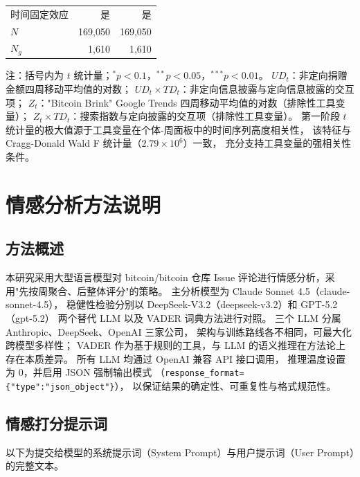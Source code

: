 \documentclass[
    type = master, %
    degree = professional,        %
    decl-page,  %
    twoside,                %
    fontset = fandol %
  ]{njuthesis}
\begin{document}
\begin{table}[htbp]
\begin{tabularx}{\textwidth}{Xrr}
        时间固定效应 & 是 & 是 \\
        $N$         & 169,050 & 169,050 \\
        $N_g$       & 1,610   & 1,610 \\
        \bottomrule
    \end{tabularx}
    \begin{minipage}{\textwidth}
        \vspace{0.3em}
        \footnotesize 注：括号内为 $t$ 统计量；$^{*}p<0.1$，$^{**}p<0.05$，$^{***}p<0.01$。
        $UD_t$：非定向捐赠金额四周移动平均值的对数；
        $UD_t \times TD_t$：非定向信息披露与定向信息披露的交互项；
        $Z_t$："Bitcoin Brink" Google Trends 四周移动平均值的对数（排除性工具变量）；
        $Z_t \times TD_t$：搜索指数与定向披露的交互项（排除性工具变量）。
        第一阶段 $t$ 统计量的极大值源于工具变量在个体-周面板中的时间序列高度相关性，
        该特征与 Cragg-Donald Wald F 统计量（$2.79 \times 10^6$）一致，
        充分支持工具变量的强相关性条件。
    \end{minipage}
\end{table}

\chapter{情感分析方法说明}

\section{方法概述}

本研究采用大型语言模型对 bitcoin/bitcoin 仓库 Issue 评论进行情感分析，采用"先按周聚合、后整体评分"的策略。
主分析模型为 Claude Sonnet 4.5（claude-sonnet-4.5），
稳健性检验分别以 DeepSeek-V3.2（deepseek-v3.2）和 GPT-5.2（gpt-5.2）
两个替代 LLM 以及 VADER 词典方法进行对照。
三个 LLM 分属 Anthropic、DeepSeek、OpenAI 三家公司，
架构与训练路线各不相同，可最大化跨模型多样性；
VADER 作为基于规则的工具，与 LLM 的语义推理在方法论上存在本质差异。
所有 LLM 均通过 OpenAI 兼容 API 接口调用，
推理温度设置为 0，并启用 JSON 强制输出模式
（\texttt{response\_format=\{"type":"json\_object"\}}），
以保证结果的确定性、可重复性与格式规范性。

\section{情感打分提示词}

以下为提交给模型的系统提示词（System Prompt）与用户提示词（User Prompt）的完整文本。
\end{document}
